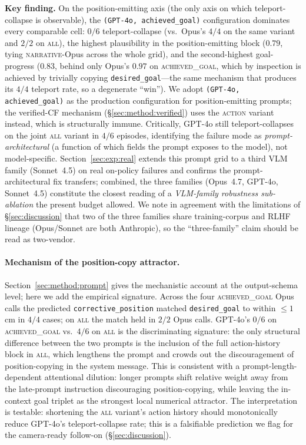 \documentclass{article}
\begin{document}
\textbf{Key finding.} On the position-emitting axis (the only axis on which
teleport-collapse is observable), the \texttt{(GPT-4o, achieved\_goal)}
configuration dominates every comparable cell:
$0/6$ teleport-collapse (vs.\ Opus's $4/4$ on the same variant and $2/2$ on
\textsc{all}), the highest plausibility in the position-emitting block
($0.79$, tying \textsc{narrative}-Opus across the whole grid), and the
second-highest goal-progress ($0.83$, behind only Opus's
$0.97$ on \textsc{achieved\_goal}, which by inspection is achieved by
trivially copying \texttt{desired\_goal}---the same mechanism that produces
its $4/4$ teleport rate, so a degenerate ``win''). We adopt
\texttt{(GPT-4o, achieved\_goal)} as the production configuration for
position-emitting prompts; the verified-CF mechanism (\S\ref{sec:method:verified})
uses the \textsc{action} variant instead, which is structurally immune.
Critically, GPT-4o still teleport-collapses on the joint \textsc{all} variant
in $4/6$ episodes, identifying the failure mode as
\emph{prompt-architectural} (a function of which fields the prompt exposes
to the model), not model-specific.
Section~\ref{sec:exp:real} extends this prompt grid to a third VLM family
(Sonnet~4.5) on real on-policy failures and confirms the prompt-architectural
fix transfers; combined, the three families (Opus~4.7, GPT-4o, Sonnet~4.5)
constitute the closest reading of a \emph{VLM-family robustness
sub-ablation} the present budget allowed. We note in agreement with the
limitations of \S\ref{sec:discussion} that two of the three families share
training-corpus and RLHF lineage (Opus/Sonnet are both Anthropic), so the
``three-family'' claim should be read as two-vendor.

\paragraph{Mechanism of the position-copy attractor.}
Section~\ref{sec:method:prompt} gives the mechanistic account at the
output-schema level; here we add the empirical signature. Across the four
\textsc{achieved\_goal} Opus calls the predicted
\texttt{corrective\_position} matched \texttt{desired\_goal} to within
$\le\!1$\,cm in $4/4$ cases; on \textsc{all} the match held in $2/2$ Opus
calls. GPT-4o's $0/6$ on \textsc{achieved\_goal} vs.\ $4/6$ on \textsc{all}
is the discriminating signature: the only structural difference between the
two prompts is the inclusion of the full action-history block in
\textsc{all}, which lengthens the prompt and crowds out the discouragement
of position-copying in the system message. This is consistent with a
prompt-length-dependent attentional dilution: longer prompts shift relative
weight away from the late-prompt instruction discouraging
position-copying, while leaving the in-context goal triplet as the strongest
local numerical attractor. The interpretation is testable:
shortening the \textsc{all} variant's action history should monotonically
reduce GPT-4o's teleport-collapse rate; this is a falsifiable prediction we
flag for the camera-ready follow-on (\S\ref{sec:discussion}).
\end{document}
